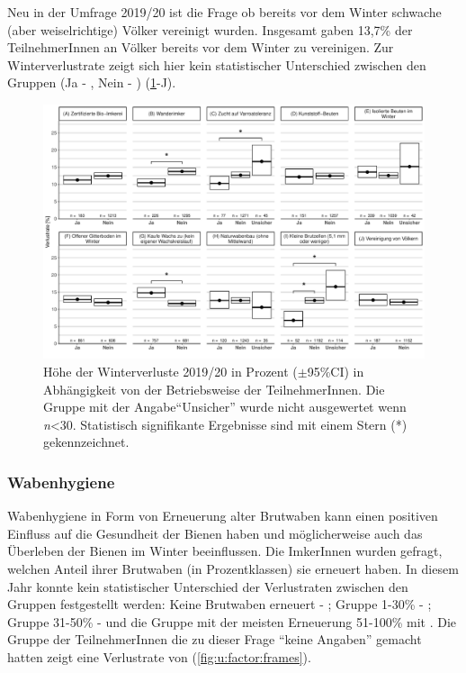 \label{ss:vereinigung:U}

Neu in der Umfrage 2019/20 ist die Frage ob bereits vor dem Winter schwache (aber weiselrichtige) Völker vereinigt wurden. Insgesamt gaben 13,7\% der TeilnehmerInnen an Völker bereits vor dem Winter zu vereinigen. Zur Winterverlustrate zeigt sich hier kein statistischer Unterschied zwischen den Gruppen (Ja - , Nein - ) (\cref{fig:u:operational:loss}-J).

\begin{figure}[H]
  \centering
  \includegraphics[keepaspectratio,width=1\textwidth]{project-U-wintersterblichkeit/figures/plot_operational_loss}
  \caption{Höhe der Winterverluste 2019/20 in Prozent ($\pm$95\%CI) in Abhängigkeit von der Betriebsweise der TeilnehmerInnen. Die Gruppe mit der Angabe\enquote{Unsicher} wurde nicht ausgewertet wenn \textit{n}<30. Statistisch signifikante Ergebnisse sind mit einem Stern (*) gekennzeichnet.}
  \label{fig:u:operational:loss}
\end{figure}
\newpage
\subsubsection{Wabenhygiene}
\label{ss:wabenhygiene:U}

Wabenhygiene in Form von Erneuerung alter Brutwaben kann einen positiven Einfluss auf die Gesundheit der Bienen haben und möglicherweise auch das Überleben der Bienen im Winter beeinflussen. Die ImkerInnen wurden gefragt, welchen Anteil ihrer Brutwaben (in Prozentklassen) sie erneuert haben. In diesem Jahr konnte kein statistischer Unterschied der Verlustraten zwischen den Gruppen festgestellt werden: Keine Brutwaben erneuert - ; Gruppe 1-30\% - ; Gruppe 31-50\% -  und die Gruppe mit der meisten Erneuerung 51-100\% mit . Die Gruppe der TeilnehmerInnen die zu dieser Frage \enquote{keine Angaben} gemacht hatten zeigt eine Verlustrate von  (\cref{fig:u:factor:frames}).

